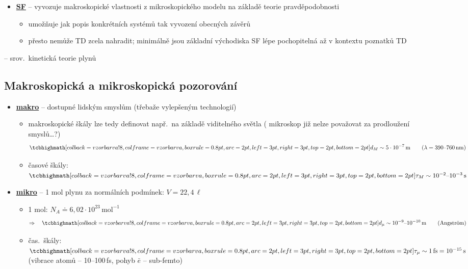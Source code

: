 \begin{itemize}
  \item \underline{\textbf{SF}} -- vyvozuje makroskopické vlastnosti z mikroskopického modelu na základě teorie pravděpodobnosti
  \begin{itemize}
    \item[--] umožňuje jak popis konkrétních systémů tak vyvození obecných závěrů
    \item[--] přesto nemůže TD zcela nahradit; minimálně jsou základní východiska SF lépe pochopitelná až v kontextu poznatků TD
  \end{itemize}
\end{itemize}

-- srov.\ kinetická teorie plynů

\providecommand{\zelene}[1]{\textcolor{OliveGreen}{#1}}
\subsection{Makroskopická a mikroskopická pozorování}

\begin{itemize}
  \item \underline{\textbf{makro}} -- dostupné lidským smyslům (třebaže vylepšeným technologií)
  \begin{itemize}
    \item[--] makroskopické škály lze tedy definovat např.\ na základě viditelného světla ( mikroskop již nelze považovat za prodloužení smyslů\dots?)
    \[ \vzorec{d_M \sim 5\cdot 10^{-7}\,\mathrm{m}} \qquad (\lambda = 390\text{--}760\,\mathrm{nm}) \]
    \item[--] časové škály: \quad $\vzorec{\tau_M \sim 10^{-2}\text{--}10^{-3}\,\mathrm{s}}$
  \end{itemize}
  \item \underline{\textbf{mikro}} -- 1 mol plynu za normálních podmínek: $V = 22{,}4\,\ell$
  \begin{itemize}
    \item[--] 1 mol: \quad $N_A \doteq 6{,}02\cdot 10^{23}\,\mathrm{mol}^{-1}$
    \[ \Rightarrow\quad \vzorec{d_\mu \sim 10^{-9}\text{--}10^{-10}\,\mathrm{m}} \qquad (\text{Angström}) \]
    \item[--] čas.\ škály: \quad $\vzorec{\tau_\mu \sim 1\,\mathrm{fs} = 10^{-15}\,\mathrm{s}}$ \\
          (vibrace atomů -- 10--100\,fs, pohyb $\bar e$ -- sub-femto)
  \end{itemize}
\end{itemize}

